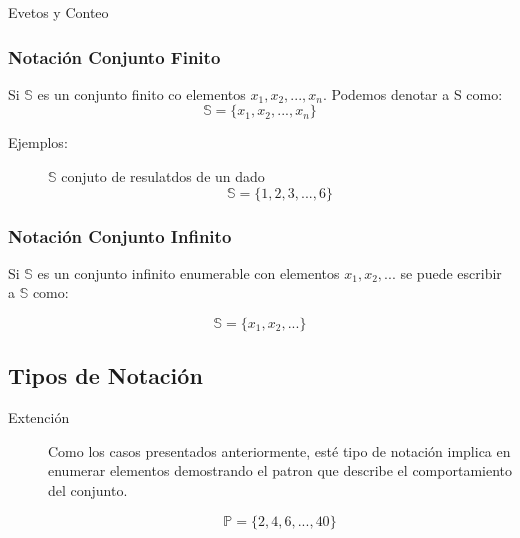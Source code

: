 \documentclass[a4paper]{book}
\begin{document}
\begin{chapter}{Evetos y Conteo}
    \subsubsection{Notación Conjunto Finito}
    \label{ssec:notacion_conjunto_finito}

        Si $ \mathbb S $ es un conjunto finito co elementos $ x_1,x_2,...,x_n
        $. Podemos denotar a S como:
        \begin{equation*}
        \label{eq:1.1}
            \mathbb S = \{x_1,x_2,...,x_n\}
        \end{equation*}

    \begin{description}
        \item[Ejemplos:] $ \mathbb S $ conjuto de resulatdos de un dado
            \begin{equation*}
            \label{eq:1.2}
                \mathbb S=\{1,2,3,...,6\}
            \end{equation*}
    \end{description}

    \subsubsection{Notación Conjunto Infinito}
    \label{ssec:notacion_conjunto_infinito}

    Si $ \mathbb S$ es un conjunto infinito enumerable con elementos $
    x_1,x_2,...$ se puede escribir a $ \mathbb S $ como:

    \begin{equation*}
    \label{eq:1.3}
        \mathbb S=\{x_1,x_2,...\}
    \end{equation*}

    \subsection{Tipos de Notación}
    \label{ssec:tipos_de_notacion}

    \begin{description}
        \item[Extención] Como los casos presentados anteriormente, esté tipo de
            notación implica en enumerar elementos demostrando el patron que
            describe el comportamiento del conjunto.

            \begin{equation*}
            \label{eq:1.4}
                \mathbb P=\{2,4,6,...,40\}
            \end{equation*}


\end{description}
\end{chapter}
\end{document}
